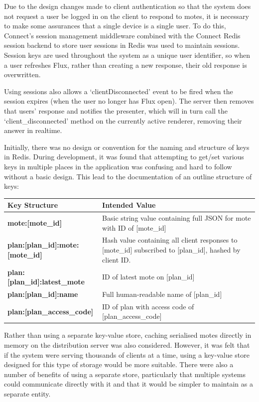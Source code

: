 \documentclass[a4papert,11pt,notitlepage]{article}
\begin{document}
Due to the design changes made to client authentication so that the system does not request a user be logged in on the client to respond to motes, it is necessary to make some assurances that a single device is a single user. To do this, Connect's session management middleware combined with the Connect Redis\cite{connectredis:web} session backend to store user sessions in Redis was used to maintain sessions. Session keys are used throughout the system as a unique user identifier, so when a user refreshes Flux, rather than creating a new response, their old response is overwritten.

Using sessions also allows a `clientDisconnected' event to be fired when the session expires (when the user no longer has Flux open). The server then removes that users' response and notifies the presenter, which will in turn call the `client\_disconnected' method on the currently active renderer, removing their answer in realtime.

Initially, there was no design or convention for the naming and structure of keys in Redis. During development, it was found that attempting to get/set various keys in multiple places in the application was confusing and hard to follow without a basic design. This lead to the documentation of an outline structure of keys:

\begin{tabular}{ l p{290pt} }
  \textbf{Key Structure} & \textbf{Intended Value} \\ \hline
  \textbf{mote:[mote\_id]} & Basic string value containing full JSON for mote with ID of [mote\_id] \\
  \textbf{plan:[plan\_id]:mote:[mote\_id]} & Hash value containing all client responses to [mote\_id] subscribed to [plan\_id], hashed by client ID. \\
  \textbf{plan:[plan\_id]:latest\_mote} & ID of latest mote on [plan\_id] \\
  \textbf{plan:[plan\_id]:name} & Full human-readable name of [plan\_id] \\
  \textbf{plan:[plan\_access\_code]} & ID of plan with access code of [plan\_access\_code] \\
\end{tabular}

Rather than using a separate key-value store, caching serialised motes directly in memory on the distribution server was also considered. However, it was felt that if the system were serving thousands of clients at a time, using a key-value store designed for this type of storage would be more suitable. There were also a number of benefits of using a separate store, particularly that multiple systems could communicate directly with it and that it would be simpler to maintain as a separate entity.
\end{document}
